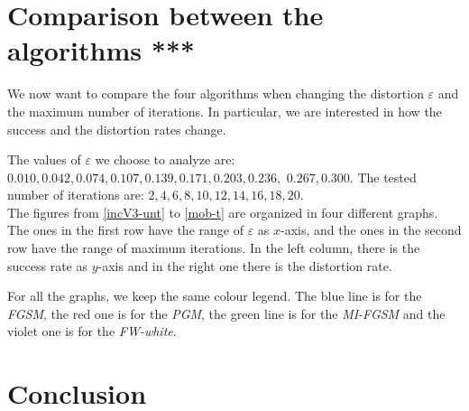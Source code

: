 \documentclass[10pt,twocolumn,letterpaper, english]{article}
\theoremstyle{definition}
\theoremstyle{plain}
\theoremstyle{plain}
\theoremstyle{plain}
\theoremstyle{plain}
\theoremstyle{remark}
\theoremstyle{remark}
\theoremstyle{definition}
\theoremstyle{definition}
\theoremstyle{definition}
\theoremstyle{definition}
\renewcommand{\epsilon}{\varepsilon}
\begin{document}
\section{Comparison between the algorithms ***}
\label{section:graphs}

We now want to compare the four algorithms when changing the distortion $\epsilon$ and the maximum number of iterations. 
In particular, we are interested in how the success and the distortion rates change. 

The values of $\epsilon$ we choose to analyze are: $0.010, 0.042, 0.074, 0.107, 0.139, 0.171, 0.203, 0.236,$  $0.267, 0.300$. The tested number of iterations are: $2,4,6,8,10,12,14,16,18,20$. \\

The figures from \ref{incV3-unt} to \ref{mob-t} are organized in four different graphs. 
The ones in the first row have the range of $\epsilon$ as $x$-axis, and the ones in the second row have the range of maximum iterations. 
In the left column, there is the success rate as $y$-axis and in the right one there is the distortion rate. 

For all the graphs, we keep the same colour legend. 
The blue line is for the \textit{FGSM}, the red one is for the \textit{PGM}, the green line is for the \textit{MI-FGSM} and the violet one is for the \textit{FW-white}. 


\section{Conclusion}
\end{document}
